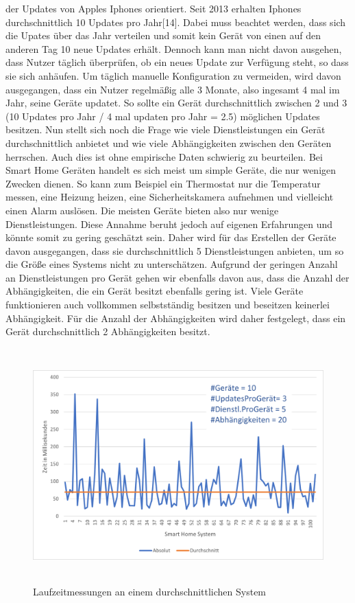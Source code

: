 der Updates von Apples Iphones orientiert. Seit 2013 erhalten Iphones durchschnittlich 10 Updates pro Jahr[14]. Dabei muss beachtet werden, dass sich die
Upates über das Jahr verteilen und somit kein Gerät von einen auf den anderen Tag 10 neue Updates erhält. Dennoch kann man nicht davon ausgehen,
dass Nutzer täglich überprüfen, ob ein neues Update zur Verfügung steht, so dass sie sich anhäufen. Um täglich manuelle Konfiguration zu vermeiden,
wird davon ausgegangen, dass ein Nutzer regelmäßig alle 3 Monate, also ingesamt 4 mal im Jahr, seine Geräte updatet. So sollte ein Gerät durchschnittlich
zwischen 2 und 3 (10 Updates pro Jahr / 4 mal updaten pro Jahr = 2.5)  möglichen Updates besitzen. 
Nun stellt sich noch die Frage wie viele Dienstleistungen
ein Gerät durchschnittlich anbietet und wie viele Abhängigkeiten zwischen den Geräten herrschen. Auch dies ist ohne empirische Daten schwierig zu beurteilen.
Bei Smart Home Geräten handelt es sich meist um simple Geräte, die nur wenigen Zwecken dienen. So kann zum Beispiel ein Thermostat nur die Temperatur messen,
eine Heizung heizen, eine Sicherheitskamera aufnehmen und vielleicht einen Alarm auslösen. Die meisten Geräte bieten also nur wenige Dienstleistungen. Diese
Annahme beruht jedoch auf eigenen Erfahrungen und könnte somit zu gering geschätzt sein. Daher wird für das Erstellen der Geräte davon ausgegangen, dass sie durchschnittlich
5 Dienstleistungen anbieten, um so die Größe eines Systems nicht zu unterschätzen. Aufgrund der geringen Anzahl an Dienstleistungen pro Gerät gehen wir ebenfalls 
davon aus, dass die Anzahl der Abhängigkeiten, die ein Gerät besitzt ebenfalls gering ist. Viele Geräte funktionieren auch vollkommen selbstständig besitzen und beseitzen keinerlei
Abhängigkeit. Für die Anzahl der Abhängigkeiten wird daher festgelegt, dass ein Gerät durchschnittlich 2 Abhängigkeiten besitzt.
\begin{figure}[h]
\begin{center}
\includegraphics[width=14cm,height=9cm]{"Durchschnitt"}
\caption{Laufzeitmessungen an einem durchschnittlichen System}
\label{fig:Prob1:MEA}
\end{center}
\end{figure}
